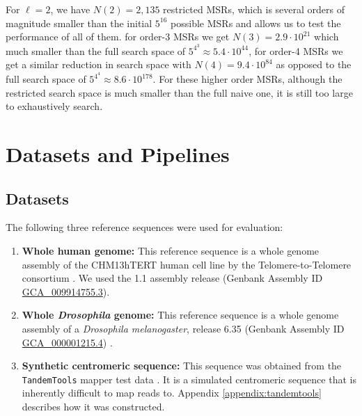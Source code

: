 \documentclass[
  11,
]{scrbook}
\begin{document}
For \(\ell=2\), we have \(N(2)=2,135\) restricted MSRs, which is
several orders of magnitude smaller than the initial \(5^{16}\) possible
MSRs and allows us to test the performance of all of them. for order-3
MSRs we get \(N(3)=2.9\cdot10^{21}\) which much smaller than the full
search space of \(5^{4^3}\approx5.4\cdot10^{44}\), for order-4 MSRs we get
a similar reduction in search space with \(N(4)=9.4\cdot10^{84}\) as
opposed to the full search space of \(5^{4^4}\approx8.6\cdot10^{178}\).
For these higher order MSRs, although the restricted search space is
much smaller than the full naive one, it is still too large to
exhaustively search.

\hypertarget{datasets-and-pipelines}{%
\section{Datasets and Pipelines}\label{datasets-and-pipelines}}

\hypertarget{datasets}{%
\subsection{Datasets}\label{datasets}}

The following three reference sequences were used for evaluation:

\begin{enumerate}
\def\labelenumi{\arabic{enumi}.}
\item
  \textbf{Whole human genome:} This reference sequence is a whole genome
  assembly of the CHM13hTERT human cell line by the
  Telomere-to-Telomere consortium \autocite{nurkCompleteSequenceHuman2021}. We
  used the 1.1 assembly release (Genbank Assembly ID
  \href{https://www.ncbi.nlm.nih.gov/assembly/GCA_009914755.3/}{GCA\_009914755.3}).
\item
  \textbf{Whole \emph{Drosophila} genome:} This reference sequence is a whole
  genome assembly of a \emph{Drosophila melanogaster}, release 6.35
  (Genbank Assembly ID
  \href{https://www.ncbi.nlm.nih.gov/assembly/GCF_000001215.4/}{GCA\_000001215.4})
  \autocite{adamsGenomeSequenceDrosophila2000}.
\item
  \textbf{Synthetic centromeric sequence:} This sequence was obtained from
  the \texttt{TandemTools} mapper test data
  \autocite{mikheenkoTandemToolsMappingLong2020}. It is a simulated
  centromeric sequence that is inherently difficult to map reads to.
  Appendix \ref{appendix:tandemtools} describes how it was constructed.
\end{enumerate}
\end{document}

